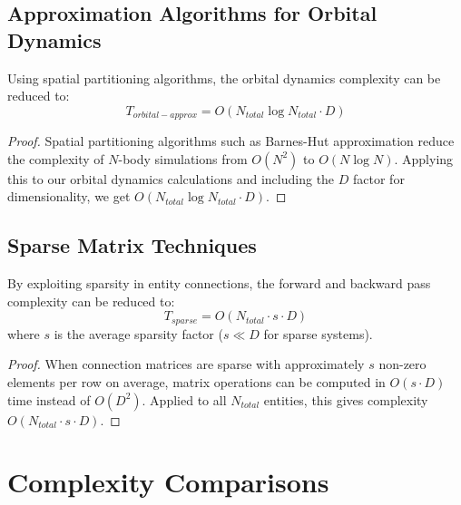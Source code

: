 \subsection{Approximation Algorithms for Orbital Dynamics}

\begin{theorem}
Using spatial partitioning algorithms, the orbital dynamics complexity can be reduced to:
\begin{equation}
T_{orbital-approx} = O(N_{total} \log N_{total} \cdot D)
\end{equation}
\end{theorem}

\begin{proof}
Spatial partitioning algorithms such as Barnes-Hut approximation reduce the complexity of $N$-body simulations from $O(N^2)$ to $O(N \log N)$. Applying this to our orbital dynamics calculations and including the $D$ factor for dimensionality, we get $O(N_{total} \log N_{total} \cdot D)$.
\end{proof}

\subsection{Sparse Matrix Techniques}

\begin{theorem}
By exploiting sparsity in entity connections, the forward and backward pass complexity can be reduced to:
\begin{equation}
T_{sparse} = O(N_{total} \cdot s \cdot D)
\end{equation}
where $s$ is the average sparsity factor ($s \ll D$ for sparse systems).
\end{theorem}

\begin{proof}
When connection matrices are sparse with approximately $s$ non-zero elements per row on average, matrix operations can be computed in $O(s \cdot D)$ time instead of $O(D^2)$. Applied to all $N_{total}$ entities, this gives complexity $O(N_{total} \cdot s \cdot D)$.
\end{proof}

\section{Complexity Comparisons}



